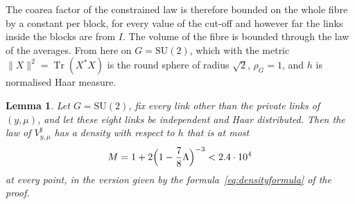 \documentclass[11pt]{amsart}
\newtheorem{lemma}[theorem]{Lemma}
\theoremstyle{definition}
\theoremstyle{remark}
\numberwithin{equation}{section}
\newcommand{\SU}{\mathrm{SU}}
\newcommand{\Tr}{\operatorname{Tr}}
\begin{document}
The coarea factor of the constrained law is therefore bounded on the whole
fibre by a constant per block, for every value of the cut-off and however
far the links inside the blocks are from $I$. The volume of the fibre is
bounded through the law of the averages. From here on $G=\SU(2)$, which with
the metric $\lVert X\rVert^2=\Tr(X^*X)$ is the round sphere of radius
$\sqrt2$, $\rho_G=1$, and $h$ is normalised Haar measure.

\begin{lemma}\label{lem:averagedensity}
Let $G=\SU(2)$, fix every link other than the private links of $(y,\mu)$,
and let these eight links be independent and Haar distributed. Then the
law of $V^\sharp_{y,\mu}$ has a density with respect to $h$ that is at most
\[
M=1+2\Bigl(1-\frac78\Lambda\Bigr)^{-3}<2.4\cdot10^4
\]
at every point, in the version given by the formula~\eqref{eq:densityformula}
of the proof.
\end{lemma}
\end{document}
